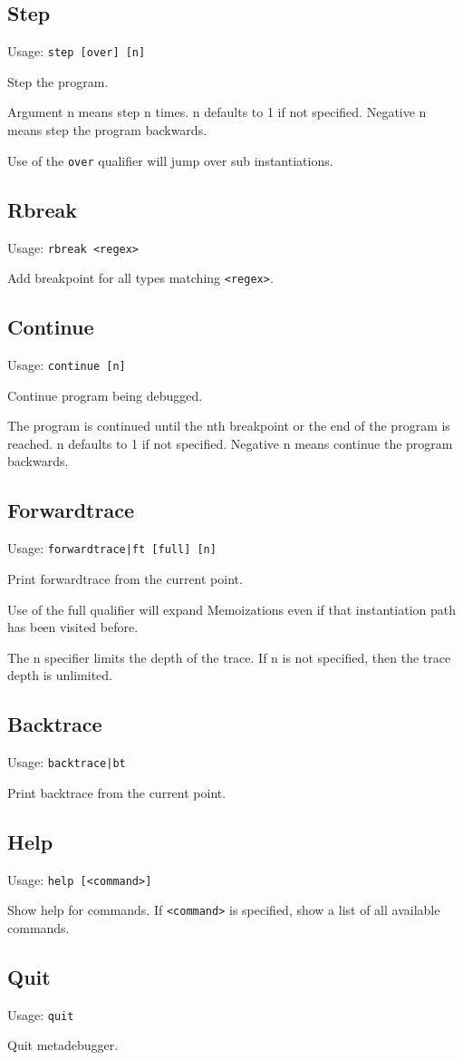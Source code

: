 \subsection*{Step}

Usage: \lstinline$step [over] [n]$

Step the program.

Argument n means step n times. n defaults to 1 if not specified. Negative n
means step the program backwards.

Use of the \lstinline$over$ qualifier will jump over sub instantiations.

\subsection*{Rbreak}

Usage: \lstinline$rbreak <regex>$

Add breakpoint for all types matching \lstinline$<regex>$.

\subsection*{Continue}

Usage: \lstinline$continue [n]$

Continue program being debugged.

The program is continued until the nth breakpoint or the end of the program is
reached. n defaults to 1 if not specified. Negative n means continue the
program backwards.

\subsection*{Forwardtrace}

Usage: \lstinline$forwardtrace|ft [full] [n]$

Print forwardtrace from the current point.

Use of the full qualifier will expand Memoizations even if that instantiation
path has been visited before.

The n specifier limits the depth of the trace. If n is not specified, then the
trace depth is unlimited.

\subsection*{Backtrace}

Usage: \lstinline$backtrace|bt$

Print backtrace from the current point.

\subsection*{Help}

Usage: \lstinline$help [<command>]$

Show help for commands.
If \lstinline$<command>$ is specified, show a list of all available commands.

\subsection*{Quit}

Usage: \lstinline$quit$

Quit metadebugger.

